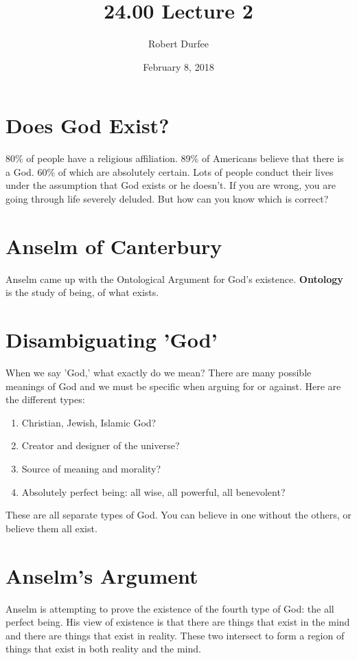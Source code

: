 \documentclass{article}
\title{ 24.00 Lecture 2 }
\author{ Robert Durfee }
\date{ February 8, 2018 }
\begin{document}
\maketitle

\section{ Does God Exist? }

80\% of people have a religious affiliation. 89\% of Americans believe that
there is a God. 60\% of which are absolutely certain. Lots of people conduct
their lives under the assumption that God exists or he doesn't. If you are
wrong, you are going through life severely deluded. But how can you know which
is correct?

\section{Anselm of Canterbury}

Anselm came up with the Ontological Argument for God's existence.
\textbf{Ontology} is the study of being, of what exists.

\section{Disambiguating 'God'}

When we say 'God,' what exactly do we mean? There are many possible meanings of
God and we must be specific when arguing for or against. Here are the different
types:

\begin{enumerate}
  \item Christian, Jewish, Islamic God?
  \item Creator and designer of the universe?
  \item Source of meaning and morality?
  \item Absolutely perfect being: all wise, all powerful, all benevolent?
\end{enumerate}

These are all separate types of God. You can believe in one without the others,
or believe them all exist.

\section{Anselm's Argument}

Anselm is attempting to prove the existence of the fourth type of God: the all
perfect being. His view of existence is that there are things that exist in the
mind and there are things that exist in reality. These two intersect to form a
region of things that exist in both reality and the mind.
\end{document}
